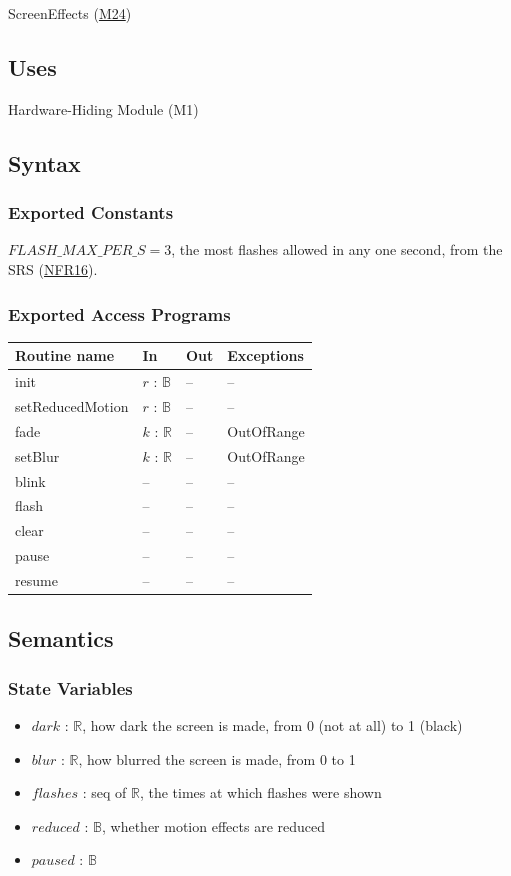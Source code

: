\documentclass[10pt, titlepage]{article}
\newcommand{\srsurl}{https://team-hindsight.github.io/ophthamology-game/SRS/SRS.pdf}
\newcommand{\srsitemref}[2]{\href{\srsurl\#nameddest=#1}{#2}}
\newcommand{\misref}[2]{\hyperref[mis:#1]{M#2}}
\newcommand{\B}{\mathbb{B}}
\newcommand{\R}{\mathbb{R}}
\newcommand{\T}[1]{\mathit{#1}}          %
\newenvironment{accessprogs}{%
  \begin{center}\small
  \begin{tabular}{>{\raggedright\arraybackslash}p{3.0cm}
    >{\raggedright\arraybackslash}p{5.0cm}
    >{\raggedright\arraybackslash}p{2.8cm}
    >{\raggedright\arraybackslash}p{3.4cm}}
  \toprule
  \textbf{Routine name} & \textbf{In} & \textbf{Out} & \textbf{Exceptions}\\
  \midrule}{%
  \bottomrule
  \end{tabular}
  \end{center}}
\begin{document}
ScreenEffects (\misref{Effects}{24})

\subsection{Uses}

Hardware-Hiding Module (M1)

\subsection{Syntax}

\subsubsection{Exported Constants}

$\T{FLASH\_MAX\_PER\_S} = 3$, the most flashes allowed in any one second, from
the SRS (\srsitemref{NFR_Flashing}{NFR16}).

\subsubsection{Exported Access Programs}

\begin{accessprogs}
init & $r$ : $\B$ & -- & --\\
setReducedMotion & $r$ : $\B$ & -- & --\\
fade & $k$ : $\R$ & -- & OutOfRange\\
setBlur & $k$ : $\R$ & -- & OutOfRange\\
blink & -- & -- & --\\
flash & -- & -- & --\\
clear & -- & -- & --\\
pause & -- & -- & --\\
resume & -- & -- & --\\
\end{accessprogs}

\subsection{Semantics}

\subsubsection{State Variables}

\begin{itemize}
\item $\T{dark}$ : $\R$, how dark the screen is made, from 0 (not at all) to 1
  (black)
\item $\T{blur}$ : $\R$, how blurred the screen is made, from 0 to 1
\item $\T{flashes}$ : seq of $\R$, the times at which flashes were shown
\item $\T{reduced}$ : $\B$, whether motion effects are reduced
\item $\T{paused}$ : $\B$
\end{itemize}
\end{document}
